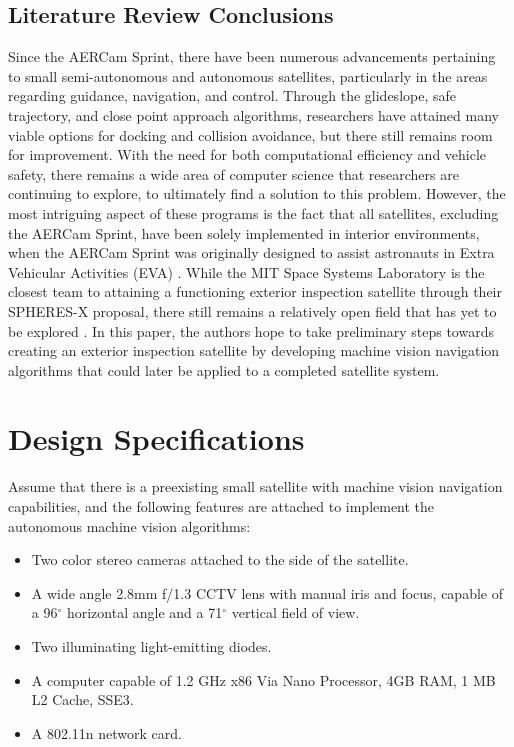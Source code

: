 \documentclass[journal, 10pt]{IEEEtran}
\begin{document}
\subsection{Literature Review Conclusions}
Since the AERCam Sprint, there have been numerous advancements pertaining to small semi-autonomous and autonomous satellites, particularly in the areas regarding guidance, navigation, and control. Through the glideslope, safe trajectory, and close point approach algorithms, researchers have attained many viable options for docking and collision avoidance, but there still remains room for improvement. With the need for both computational efficiency and vehicle safety, there remains a wide area of computer science that researchers are continuing to explore, to ultimately find a solution to this problem. However, the most intriguing aspect of these programs is the fact that all satellites, excluding the AERCam Sprint, have been solely implemented in interior environments, when the AERCam Sprint was originally designed to assist astronauts in Extra Vehicular Activities (EVA) \cite{Aercam, MiniAercam}. While the MIT Space Systems Laboratory is the closest team to attaining a functioning exterior inspection satellite through their SPHERES-X proposal, there still remains a relatively open field that has yet to be explored \cite{SPHERES}. In this paper, the authors hope to take preliminary steps towards creating an exterior inspection satellite by developing machine vision navigation algorithms that could later be applied to a completed satellite system.

\section{Design Specifications}
Assume that there is a preexisting small satellite with machine vision navigation capabilities, and the following features are attached to implement the autonomous machine vision algorithms:
\begin{itemize}
\item Two color stereo cameras attached to the side of the satellite.
\item A wide angle 2.8mm f/1.3 CCTV lens with manual iris and focus, capable of a 96$^{\circ}$ horizontal angle and a 71$^{\circ}$ vertical field of view.
\item Two illuminating light-emitting diodes.
\item A computer capable of 1.2 GHz x86 Via Nano Processor, 4GB RAM, 1 MB L2 Cache, SSE3.
\item A 802.11n network card.
\end{itemize}
\cite{Vertigo2, Vertigo3, virt_sim, lens}
\end{document}
